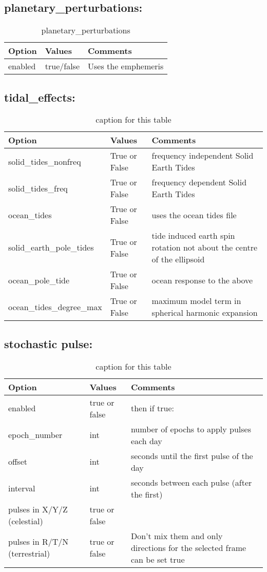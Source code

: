 \subsection{planetary\_perturbations:}
\begin{table}[h!]
	\begin{tabular}{|p{2.5cm}|p{2.5cm}|p{5cm}|}
		\hline
		Option & Values & Comments \\
		\hline
	    enabled & true/false & Uses the emphemeris \\ %
		\hline
	\end{tabular}
	\caption{planetary\_perturbations}
	\label{table:label_name}
\end{table}  
%
\subsection{tidal\_effects:}
\begin{table}[h!]
	\begin{tabular}{|p{2.5cm}|p{2.5cm}|p{5cm}|}
	\hline
	Option & Values & Comments \\
	\hline
	solid\_tides\_nonfreq & True or False & frequency independent Solid Earth Tides \\
	solid\_tides\_freq & True or False & frequency dependent Solid Earth Tides \\
	ocean\_tides & True or False & uses the ocean tides file \\
	solid\_earth\_pole\_tides & True or False & tide induced earth spin rotation not about the centre of the ellipsoid \\
	ocean\_pole\_tide & True or False & ocean response to the above \\
	ocean\_tides\_degree\_max & True or False & maximum model term in spherical harmonic expansion \\
	\hline
\end{tabular}
\caption{caption for this table}
\label{table:label_name}
\end{table}
%
\subsection{stochastic pulse:}
\begin{table}[h!]
	\begin{tabular}{|p{2.5cm}|p{2.5cm}|p{5cm}|}
		\hline
		Option & Values & Comments \\
		\hline
		enabled & true or false & then if true: \\
		\hline
		epoch\_number & int & number of epochs to apply pulses each day \\
		offset & int & seconds until the first pulse of the day \\
		interval & int & seconds between each pulse (after the first)\\
		\hline
		pulses in X/Y/Z (celestial) & true or false & \\
		pulses in R/T/N (terrestrial) & true or false & Don't mix them and only directions for the selected frame can be set true\\
		\hline
	\end{tabular}
	\caption{caption for this table}
	\label{table:label_name}
\end{table}

